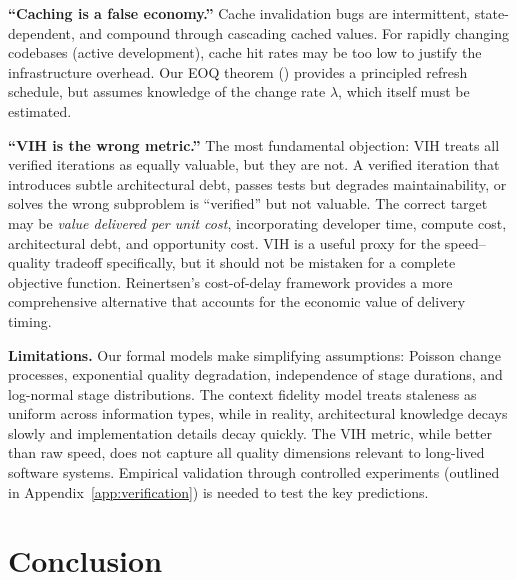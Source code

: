 \documentclass[11pt, a4paper, logo, copyright]{googledeepmind}
\begin{document}
\textbf{``Caching is a false economy.''} Cache invalidation bugs are intermittent, state-dependent, and compound through cascading cached values. For rapidly changing codebases (active development), cache hit rates may be too low to justify the infrastructure overhead. Our EOQ theorem () provides a principled refresh schedule, but assumes knowledge of the change rate $\lambda$, which itself must be estimated.

\textbf{``VIH is the wrong metric.''} The most fundamental objection: VIH treats all verified iterations as equally valuable, but they are not. A verified iteration that introduces subtle architectural debt, passes tests but degrades maintainability, or solves the wrong subproblem is ``verified'' but not valuable. The correct target may be \emph{value delivered per unit cost}, incorporating developer time, compute cost, architectural debt, and opportunity cost. VIH is a useful proxy for the speed--quality tradeoff specifically, but it should not be mistaken for a complete objective function. Reinertsen's cost-of-delay framework provides a more comprehensive alternative that accounts for the economic value of delivery timing.

\textbf{Limitations.} Our formal models make simplifying assumptions: Poisson change processes, exponential quality degradation, independence of stage durations, and log-normal stage distributions. The context fidelity model treats staleness as uniform across information types, while in reality, architectural knowledge decays slowly and implementation details decay quickly. The VIH metric, while better than raw speed, does not capture all quality dimensions relevant to long-lived software systems. Empirical validation through controlled experiments (outlined in Appendix~\ref{app:verification}) is needed to test the key predictions.


\section{Conclusion}\label{sec:conclusion}
\end{document}
